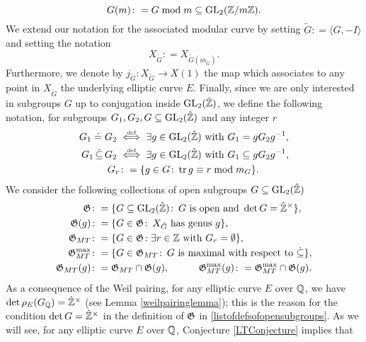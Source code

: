 \[
G(m) \colon= G \bmod m \subseteq \operatorname{GL}_2(\mathbb{Z}/m\mathbb{Z}).  
\]
We extend our notation for the associated modular curve by setting $\tilde{G} \colon= \langle G, -I \rangle$ and setting the notation
\[
X_{\tilde{G}} \colon= X_{\tilde{G}(m_{\tilde{G}})}.
\]
Furthermore, we denote by $j_{\tilde{G}} \colon X_{\tilde{G}} \longrightarrow X(1)$ the map which associates to any point in $X_{\tilde{G}}$ the underlying elliptic curve $E$.  
Finally, since we are only interested in subgroups $G$ up to conjugation inside $\operatorname{GL}_2(\hat{\mathbb{Z}})$, we define the following notation, for subgroups $G_1, G_2, G \subseteq \operatorname{GL}_2(\hat{\mathbb{Z}})$ and any integer $r$\colon
\begin{equation} \label{defofdotrelations}
\begin{split}
G_1 \doteq G_2 \; &\myeq \; \exists g \in \GL_2(\hat{\mbz}) \text{ with } G_1 = g G_2 g^{-1}, \\
G_1 \, \dot\subseteq \, G_2 \; &\myeq \; \exists g \in \GL_2(\hat{\mbz}) \text{ with } G_1 \subseteq g G_2 g^{-1}, \\
G_r &\colon= \{ g \in G \colon \tr g \equiv r \bmod m_G \}.
\end{split}
\end{equation}
We consider the following collections of open subgroups $G \subseteq \operatorname{GL}_2(\hat{\mathbb{Z}})$\colon
\begin{equation} \label{listofdefsofopensubgroups}
\begin{split}
\mathfrak{G} &\colon= \{ G \subseteq \operatorname{GL}_2(\hat{\mathbb{Z}}) \colon \, G \text{ is open and } \det G = \hat{\mathbb{Z}}^\times \}, \\
\mathfrak{G}(g) &\colon= \{ G \in \mathfrak{G} \colon \,  X_{\tilde{G}} \text{ has genus } g \}, \\
\mathfrak{G}_{MT} &\colon= \{ G \in \mathfrak{G}  \colon  \exists r \in \mathbb{Z} \text{ with } G_r = \emptyset \}, \\
\mathfrak{G}_{MT}^{\max} &\colon= \{ G \in \mathfrak{G}_{MT} \colon \, G \text{ is maximal with respect to } \dot\subseteq \}, \\
\mathfrak{G}_{MT}(g) &\colon= \mathfrak{G}_{MT} \cap \mathfrak{G}(g),  \quad\quad\quad \mathfrak{G}_{MT}^{\max}(g) \colon= \mathfrak{G}_{MT}^{\max} \cap \mathfrak{G}(g).\\
\end{split}
\end{equation}
As a consequence of the Weil pairing, for any elliptic curve $E$ over $\mathbb{Q}$, we have $\det \rho_{E}(G_{\mathbb{Q}}) = \hat{\mathbb{Z}}^\times$ (see Lemma \ref{weilpairinglemma}); this is the reason for the condition $\det G = \hat{\mathbb{Z}}^\times$ in the definition of $\mathfrak{G}$ in \eqref{listofdefsofopensubgroups}.  As we will see, for any elliptic curve $E$ over $\mathbb{Q}$, Conjecture \ref{LTConjecture} implies that
